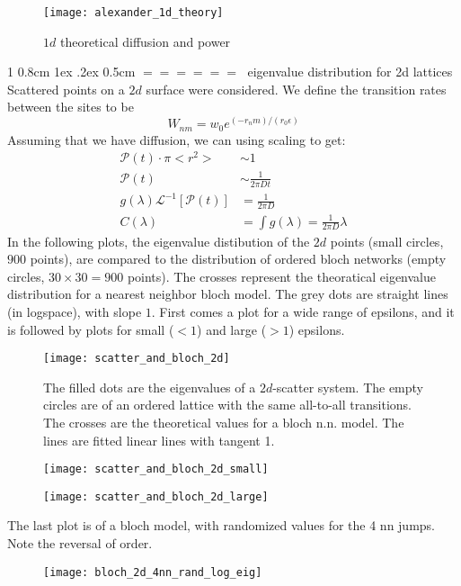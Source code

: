\documentclass[onecolumn,fleqn,notitlepage,secnumarabic]{revtex4}
\makeatletter
\def\section{%
  \@startsection
    {section}%
    {1}%
    {\z@}%
    {0.8cm \@plus1ex \@minus .2ex}%
    {0.5cm}%
    {\Large\bf $=\!=\!=\!=\!=\!=\;$}%
}%
\makeatother
\begin{document}
\begin{figure}[H]
\texttt{[image: alexander\_1d\_theory]}
\caption{$1d$ theoretical diffusion and power}
\end{figure}

\section{eigenvalue distribution for 2d lattices}
Scattered points on a $2d$ surface were considered. We define the transition rates between the sites to be 
\[ W_{nm} = w_0 e^{(-r_nm)/(r_0\epsilon)} \]
Assuming that we have diffusion, we can using scaling to get:
\begin{align} 
    \mathcal{P}(t) \cdot \pi <r^2> &\sim 1 \\
    \mathcal{P}(t) &\sim \frac{1}{2\pi Dt}\\
    g(\lambda)\mathcal{L}^{-1}\left[\mathcal{P}(t)\right]&= \frac{1}{2\pi D} \\
    C(\lambda) &= \int g(\lambda) = \frac{1}{2\pi D}\lambda
\end{align}
In the following plots, the eigenvalue distibution of the $2d$ points (small circles, $900$ points), are compared to the distribution of ordered bloch networks (empty circles, $30\times30=900$ points). The crosses represent the theoratical eigenvalue distribution for a nearest neighbor bloch model. The grey dots are straight lines (in logspace), with slope $1$. First comes a plot for a wide range of epsilons, and it is followed by plots for small ($<1$) and large ($>1$) epsilons.

\begin{figure}[H]
\texttt{[image: scatter\_and\_bloch\_2d]}
\caption{The filled dots are the eigenvalues of a $2d$-scatter system. The empty circles are of an ordered lattice with the same all-to-all transitions. The crosses are the theoretical values for a bloch n.n. model. The lines are fitted linear lines with tangent 1.}
\end{figure}
\begin{figure}[H]
\texttt{[image: scatter\_and\_bloch\_2d\_small]}
\caption{}
\end{figure}
\begin{figure}[H]
\texttt{[image: scatter\_and\_bloch\_2d\_large]}
\end{figure}



The last plot is of a bloch model, with randomized values for the 4 nn jumps. Note the reversal of order.
\begin{figure}[H]
\texttt{[image: bloch\_2d\_4nn\_rand\_log\_eig]}
\end{figure}
\end{document}
